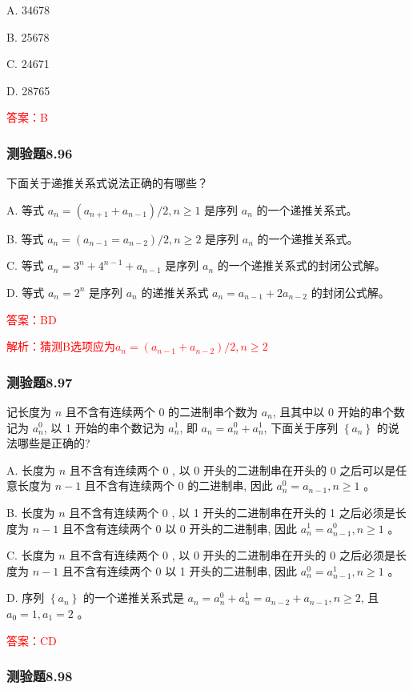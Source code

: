 \documentclass[UTF8, heading=true]{ctexart}
\begin{document}
A. 34678

B. 25678

C. 24671

D. 28765

\textcolor{red}{答案：B}

\subsubsection{测验题8.96}

下面关于递推关系式说法正确的有哪些？

A. 等式 $a_n=\left(a_{n+1}+a_{n-1}\right) / 2, n \geq 1$ 是序列 $a_n$ 的一个递推关系式。

B. 等式 $a_n=\left(a_{n-1}=a_{n-2}\right) / 2, n \geq 2$ 是序列 $a_n$ 的一个递推关系式。

C. 等式 $a_n=3^n+4^{n-1}+a_{n-1}$ 是序列 $a_n$ 的一个递推关系式的封闭公式解。

D. 等式 $a_n=2^n$ 是序列 $a_n$ 的递推关系式 $a_n=a_{n-1}+2 a_{n-2}$ 的封闭公式解。

\textcolor{red}{答案：BD}

\textcolor{red}{解析：猜测B选项应为$a_n=\left(a_{n-1}+a_{n-2}\right) / 2, n \geq 2$}

\subsubsection{测验题8.97}

记长度为 $n$ 且不含有连续两个 0 的二进制串个数为 $a_n$, 且其中以 0 开始的串个数记为 $a_n^0$, 以 1 开始的串个数记为 $a_n^1$, 即 $a_n=a_n^0+a_n^1$, 下面关于序列 $\left\{a_n\right\}$ 的说法哪些是正确的?

A. 长度为 $n$ 且不含有连续两个 0 , 以 0 开头的二进制串在开头的 0 之后可以是任意长度为 $n-1$ 且不含有连续两个 0 的二进制串, 因此 $a_n^0=a_{n-1}, n \geq 1$ 。

B. 长度为 $n$ 且不含有连续两个 0 , 以 1 开头的二进制串在开头的 1 之后必须是长度为 $n-1$ 且不含有连续两个 0 以 0 开头的二进制串, 因此 $a_n^1=a_{n-1}^0, n \geq 1$ 。

C. 长度为 $n$ 且不含有连续两个 0 , 以 0 开头的二进制串在开头的 0 之后必须是长度为 $n-1$ 且不含有连续两个 0 以 1 开头的二进制串, 因此 $a_n^0=a_{n-1}^1, n \geq 1$ 。

D. 序列 $\left\{a_n\right\}$ 的一个递推关系式是 $a_n=a_n^0+a_n^1=a_{n-2}+a_{n-1}, n \geq 2$, 且 $a_0=1, a_1=2$ 。

\textcolor{red}{答案：CD}

\subsubsection{测验题8.98}
\end{document}
